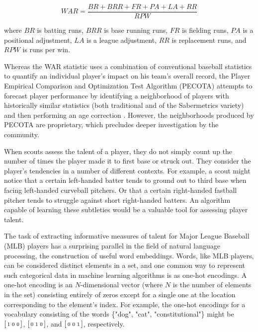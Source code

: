 \documentclass{article}
\begin{document}
\begin{equation}
\label{eqn:war}
WAR = \frac{BR + BRR + FR + PA + LA + RR}{RPW}
\end{equation}

where $BR$ is batting runs, $BRR$ is base running runs, $FR$ is fielding runs, $PA$ is a positional adjustment, $LA$ is a league adjustment, $RR$ is replacement runs, and $RPW$ is runs per win.

Whereas the WAR statistic uses a combination of conventional baseball statistics to quantify an individual player's impact on his team's overall record, the Player Empirical Comparison and Optimization Test Algorithm (PECOTA) attempts to forecast player performance by identifying a neighborhood of players with historically similar statistics (both traditional and of the Sabermetrics variety) and then performing an age correction \parencite{PECOTA}. However, the neighborhoods produced by PECOTA are proprietary, which precludes deeper investigation by the community.

When scouts assess the talent of a player, they do not simply count up the number of times the player made it to first base or struck out. They consider the player's tendencies in a number of different contexts. For example, a scout might notice that a certain left-handed batter tends to ground out to third base when facing left-handed curveball pitchers. Or that a certain right-handed fastball pitcher tends to struggle against short right-handed batters. An algorithm capable of learning these subtleties would be a valuable tool for assessing player talent.

The task of extracting informative measures of talent for Major League Baseball (MLB) players has a surprising parallel in the field of natural language processing, the construction of useful word embeddings. Words, like MLB players, can be considered distinct elements in a set, and one common way to represent such categorical data in machine learning algorithms is as one-hot encodings. A one-hot encoding is an $N$-dimensional vector (where $N$ is the number of elements in the set) consisting entirely of zeros except for a single one at the location corresponding to the element's index. For example, the one-hot encodings for a vocabulary consisting of the words \{"dog", "cat", "constitutional"\} might be $\begin{bsmallmatrix} 1 & 0 & 0 \end{bsmallmatrix}$, $\begin{bsmallmatrix} 0 & 1 & 0 \end{bsmallmatrix}$, and $\begin{bsmallmatrix} 0 & 0 & 1 \end{bsmallmatrix}$, respectively.
\end{document}
